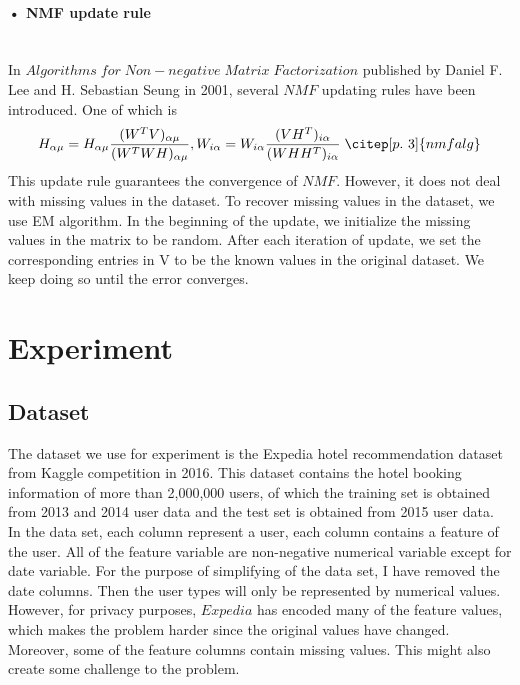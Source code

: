 \documentclass[11pt]{article} %
\begin{document}
\paragraph{• NMF update rule}\mbox{}\\
In $Algorithms\;for\;Non-negative\;Matrix\; Factorization$ published by Daniel F. Lee and H. Sebastian Seung in 2001, several $NMF$ updating rules have been introduced. One of which is
\begin{equation}
H_{\alpha\mu} = H_{\alpha\mu}\frac{(W^{T}V)_{\alpha\mu}}{(W^{T}WH)_{\alpha\mu}}, W_{i\alpha} = W_{i\alpha}\frac{(VH^{T})_{i\alpha}}{(WHH^{T})_{i\alpha}} \; \citep[p.~3]{nmfalg}
\end{equation}
This update rule guarantees the convergence of $NMF$. However, it does not deal with missing values in the dataset. To recover missing values in the dataset, we use EM algorithm. In the beginning of the update, we initialize the missing values in the matrix to be random. After each iteration of update, we set the corresponding entries in V to be the known values in the original dataset. We keep doing so until the error converges.
\section{Experiment}
\subsection{Dataset}
The dataset we use for experiment is the Expedia hotel recommendation dataset from Kaggle competition \cite{kaggle} in 2016. This dataset contains the hotel booking information of more than 2,000,000 users, of which the training set is obtained from 2013 and 2014 user data and the test set is obtained from 2015 user data.\\
In the data set, each column represent a user, each column contains a feature of the user. All of the feature variable are non-negative numerical variable except for date variable. For the purpose of simplifying of the data set, I have removed the date columns. Then the user types will only be represented by numerical values.\\
However, for privacy purposes, $Expedia$ has encoded many of the feature values, which makes the problem harder since the original values have changed. Moreover, some of the feature columns contain missing values. This might also create some challenge to the problem.
\end{document}
